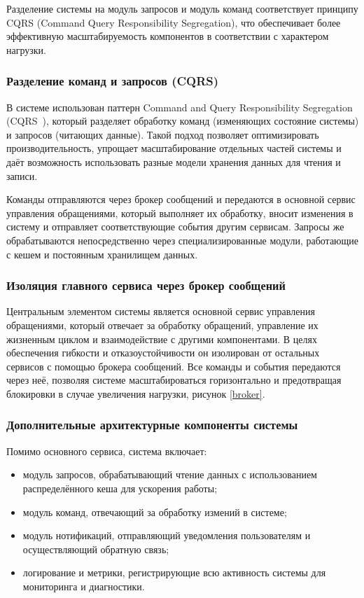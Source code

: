 Разделение системы на модуль запросов и модуль команд соответствует принципу CQRS (Command Query Responsibility Segregation), что обеспечивает более эффективную масштабируемость компонентов в соответствии с характером нагрузки.

\subsubsection{Разделение команд и запросов (CQRS)}

В системе использован паттерн Command and Query Responsibility Segregation (CQRS~\cite{CQRS}), который разделяет обработку команд (изменяющих состояние системы) и запросов (читающих данные). Такой подход позволяет оптимизировать производительность, упрощает масштабирование отдельных частей системы и даёт возможность использовать разные модели хранения данных для чтения и записи.

Команды отправляются через брокер сообщений и передаются в основной сервис управления обращениями, который выполняет их обработку, вносит изменения в систему и отправляет соответствующие события другим сервисам. Запросы же обрабатываются непосредственно через специализированные модули, работающие с кешем и постоянным хранилищем данных.

\subsubsection{Изоляция главного сервиса через брокер сообщений}

Центральным элементом системы является основной сервис управления обращениями, который отвечает за обработку обращений, управление их жизненным циклом и взаимодействие с другими компонентами. В целях обеспечения гибкости и отказоустойчивости он изолирован от остальных сервисов с помощью брокера сообщений. Все команды и события передаются через неё, позволяя системе масштабироваться горизонтально и предотвращая блокировки в случае увеличения нагрузки, рисунок \ref{broker}.


\subsubsection{Дополнительные архитектурные компоненты системы}

Помимо основного сервиса, система включает:

\begin{itemize}
    \item модуль запросов, обрабатывающий чтение данных с использованием распределённого кеша для ускорения работы;
    \item модуль команд, отвечающий за обработку измений в системе;
    \item модуль нотификаций, отправляющий уведомления пользователям и осуществляющий обратную связь;
    \item логирование и метрики, регистрирующие всю активность системы для мониторинга и диагностики.
\end{itemize}

